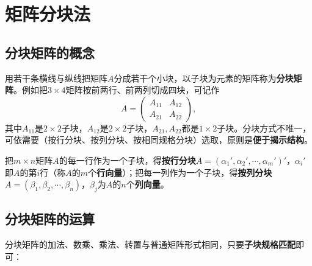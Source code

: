 
\section{矩阵分块法}

\subsection{分块矩阵的概念}

用若干条横线与纵线把矩阵$A$分成若干个小块，以子块为元素的矩阵称为\textbf{分块矩阵}。例如把$3\times4$矩阵按前两行、前两列切成四块，可记作
\[
A=\begin{pmatrix}A_{11}&A_{12}\\A_{21}&A_{22}\end{pmatrix},
\]
其中$A_{11}$是$2\times2$子块，$A_{12}$是$2\times2$子块，$A_{21},A_{22}$都是$1\times2$子块。分块方式不唯一，可依需要（按行分块、按列分块、按相同规格分块）选取，原则是\textbf{便于揭示结构}。

把$m\times n$矩阵$A$的每一行作为一个子块，得\textbf{按行分块}$A=(\alpha_1',\alpha_2',\cdots,\alpha_m')'$，$\alpha_i'$即$A$的第$i$行（称$A$的$m$个\textbf{行向量}）；把每一列作为一个子块，得\textbf{按列分块}$A=(\beta_1,\beta_2,\cdots,\beta_n)$，$\beta_j$为$A$的$n$个\textbf{列向量}。

\subsection{分块矩阵的运算}

分块矩阵的加法、数乘、乘法、转置与普通矩阵形式相同，只要\textbf{子块规格匹配}即可：

